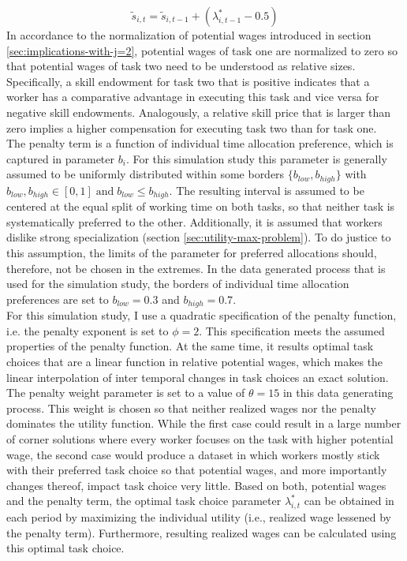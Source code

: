 \documentclass[../main.tex]{subfiles}
\begin{document}
\begin{equation} \label{eq:skill_accumulation}
\tilde{s}_{i,t} = \tilde{s}_{i, t-1} + (\lambda_{i, t-1}^* - 0.5)
\end{equation}
In accordance to the normalization of potential wages introduced in section \ref{sec:implications-with-j=2}, potential wages of task one are normalized to zero so that potential wages of task two need to be understood as relative sizes. Specifically, a skill endowment for task two that is positive indicates that a worker has a comparative advantage in executing this task and vice versa for negative skill endowments. Analogously, a relative skill price that is larger than zero implies a higher compensation for executing task two than for task one.
\\
The penalty term is a function of individual time allocation preference, which is captured in parameter $b_i$. For this simulation study this parameter is generally assumed to be uniformly distributed within some borders $\{b_{low}, b_{high}\}$ with $b_{low}, b_{high} \in [0, 1] \; \text{and} \; b_{low} \leq b_{high}$. The resulting interval is assumed to be centered at the equal split of working time on both tasks, so that neither task is systematically preferred to the other. Additionally, it is assumed that workers dislike strong specialization (section \ref{sec:utility-max-problem}). To do justice to this assumption, the limits of the parameter for preferred allocations should, therefore, not be chosen in the extremes. In the data generated process that is used for the simulation study, the borders of individual time allocation preferences are set to $b_{low} = 0.3$ and $b_{high} = 0.7$.
\\
For this simulation study, I use a quadratic specification of the penalty function, i.e. the penalty exponent is set to $\phi = 2$. This specification meets  the assumed properties of the penalty function. At the same time, it results optimal task choices that are a linear function in relative potential wages, which makes the linear interpolation of inter temporal changes in task choices an exact solution. The penalty weight parameter is set to a value of $\theta = 15$ in this data generating process. This weight is chosen so that neither realized wages nor the penalty dominates the utility function. While the first case could result in a large number of corner solutions where every worker focuses on the task with higher potential wage, the second case would produce a dataset in which workers mostly stick with their preferred task choice so that potential wages, and more importantly changes thereof, impact task choice very little. Based on both, potential wages and the penalty term, the optimal task choice parameter $\lambda_{i,t}^*$ can be obtained in each period by maximizing the individual utility (i.e., realized wage lessened by the penalty term). Furthermore, resulting realized wages can be calculated using this optimal task choice.
\end{document}
